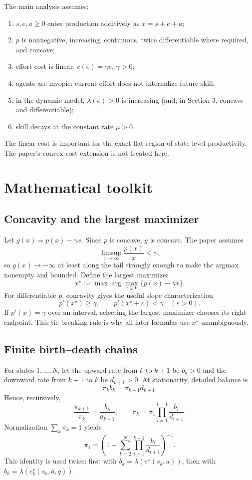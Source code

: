 \documentclass[11pt]{article}
\theoremstyle{tutorial}
\theoremstyle{remark}
\newcommand{\1}{\mathbb{I}}
\begin{document}
The main analysis assumes:
\begin{enumerate}
  \item $s,e,a\ge 0$ enter production additively as $x=s+e+a$;
  \item $p$ is nonnegative, increasing, continuous, twice differentiable where required, and concave;
  \item effort cost is linear, $c(e)=\gamma e$, $\gamma>0$;
  \item agents are myopic: current effort does not internalize future skill;
  \item in the dynamic model, $\lambda(e)>0$ is increasing (and, in Section 3, concave and differentiable);
  \item skill decays at the constant rate $\mu>0$.
\end{enumerate}
The linear cost is important for the exact flat region of state-level productivity.  The paper's convex-cost
extension is not treated here.

\section{Mathematical toolkit}

\subsection{Concavity and the largest maximizer}

Let $g(x)=p(x)-\gamma x$.  Since $p$ is concave, $g$ is concave.  The paper assumes
\[
  \limsup_{x\to\infty}\frac{p(x)}{x}<\gamma,
\]
so $g(x)\to-\infty$ at least along the tail strongly enough to make the argmax nonempty and bounded.
Define the largest maximizer
\[
  x^\star:=\max\arg\max_{x\ge0}\{p(x)-\gamma x\}.
\]
For differentiable $p$, concavity gives the useful slope characterization
\[
  p'(x^\star)\ge\gamma,
  \qquad p'(x^\star+\varepsilon)<\gamma\quad(\varepsilon>0).
\]
If $p'(x)=\gamma$ over an interval, selecting the largest maximizer chooses its right endpoint.  This
tie-breaking rule is why all later formulas use $x^\star$ unambiguously.

\subsection{Finite birth--death chains}

For states $1,\ldots,N$, let the upward rate from $k$ to $k+1$ be $b_k>0$ and the downward rate from
$k+1$ to $k$ be $d_{k+1}>0$.  At stationarity, detailed balance is
\[
  \pi_k b_k=\pi_{k+1}d_{k+1}.
\]
Hence, recursively,
\[
  \frac{\pi_{k+1}}{\pi_k}=\frac{b_k}{d_{k+1}},\qquad
  \pi_k=\pi_1\prod_{i=1}^{k-1}\frac{b_i}{d_{i+1}}.
\]
Normalization $\sum_k\pi_k=1$ yields
\[
  \pi_1=\left(1+\sum_{k=2}^{N}\prod_{i=1}^{k-1}\frac{b_i}{d_{i+1}}\right)^{-1}.
\]
This identity is used twice: first with $b_k=\lambda(e^\star(s_k,a))$, then with
$b_k=\lambda(e_b^\star(s_k,\bar a,q))$.
\end{document}
